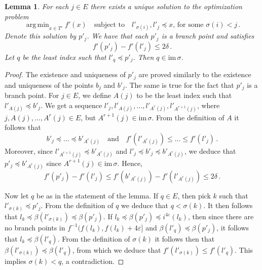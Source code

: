 \documentclass{article}
\DeclareMathOperator*{\argmin}{arg\,min}
\newtheorem{lemma}[theorem]{Lemma}
\theoremstyle{definition}
\newcommand{\im}{\mathrm{im}\,}
\renewcommand{\epsilon}{\varepsilon}
\begin{document}
\begin{lemma}
    \label{lem:plemma}
    For each $j \in E$ there exists a unique solution to the optimization problem
    \begin{equation*}
        \argmin_{x \in T'} f'(x) \quad \text{subject to} \quad l'_{\sigma(i)}, l'_j \preceq x \text{, for some }\sigma(i) < j \,.
    \end{equation*}
    Denote this solution by $p'_j$. We have that each $p'_j$ is a branch point and satisfies
    \begin{equation*}
        f'(p'_j) - f'(l'_j) \leq 2\delta\,.
    \end{equation*}
    Let $q$ be the least index such that $l'_q \preceq p'_j$. Then $q \in \im \sigma$.
\end{lemma}

\begin{proof}
    The existence and uniqueness of $p'_j$ are proved similarly to the existence and uniqueness of the points $b_j$ and $b'_j$. The same is true for the fact that $p'_j$ is a branch point. For $j \in E$, we define $A(j)$ to be the least index such that $l'_{A(j)}\preceq b'_j$. We get a sequence $l'_j, l'_{A(j)}, \ldots, l'_{A^r(j)}, l'_{A^{r+1}(j)}$, where $j, A(j), \ldots, A^r(j) \in E$, but $A^{r+1}(j) \in \im \sigma$. From the definition of $A$ it follows that
    \begin{equation*}
        b'_j \preceq \ldots \preceq b'_{A^r(j)} \quad \text{and} \quad f'(l'_{A^r(j)})\leq \ldots \leq f'(l'_j)\,.
    \end{equation*}
    Moreover, since $l'_{A^{r+1}(j)} \preceq b'_{A^{r}(j)}$ and $l'_j \preceq b'_j \preceq b'_{A^{r}(j)}$, we deduce that $p'_j \preceq b'_{A^{r}(j)}$ since $A^{r+1}(j) \in \im \sigma$.
    Hence,
    \begin{equation*}
        f'(p'_j) - f'(l'_j) \leq f'(b'_{A^r(j)}) - f'(l'_{A^r(j)}) \leq 2\delta\,.
    \end{equation*}

    Now let $q$ be as in the statement of the lemma. If $q \in E$, then pick $k$ such that $l'_{\sigma(k)} \preceq p'_j$. From the definition of $q$ we deduce that $q < \sigma(k)$. It then follows that $l_k\preceq \beta(l'_{\sigma(k)}) \preceq \beta(p'_j)$. If $l_k \preceq \beta(p'_j) \preceq i^{4\epsilon}(l_k)$, then since there are no branch points in $f^{-1}(f(l_k), f(l_k) + 4\epsilon]$ and $\beta(l'_q) \preceq \beta(p'_j)$, it follows that $l_k \preceq \beta(l'_q)$. From the definition of $\sigma(k)$ it follows then that $\beta(l'_{\sigma(k)}) \preceq \beta(l'_q)$, from which we deduce that $f'(l'_{\sigma(k)}) \leq f'(l'_q)$. This implies $\sigma(k) < q$, a contradiction.


\end{proof}
\end{document}
